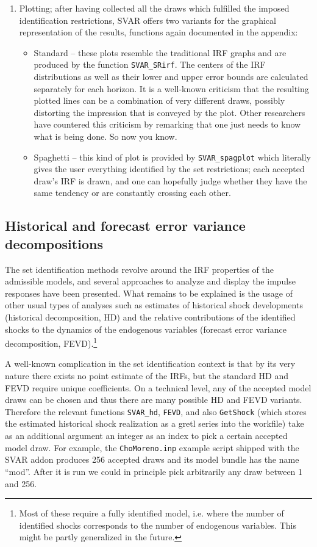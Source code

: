 \documentclass[a4paper,10pt]{article}
\newcounter{script}[section]
\begin{document}
\begin{enumerate}
\item Plotting; after having collected all the draws which fulfilled the imposed
  identification restrictions, SVAR offers two variants for the graphical
  representation of the results, functions again documented in the appendix:
  \begin{itemize}
  \item Standard -- these plots resemble the traditional IRF graphs and are produced 
    by the function \texttt{SVAR\_SRirf}. The centers of the
    IRF distributions as well as their lower and upper error bounds are calculated 
    separately for each horizon. It is a well-known criticism that the resulting plotted
    lines can be a combination of very different draws, possibly distorting the impression 
    that is conveyed by the plot. Other researchers have countered this criticism by 
    remarking that one just needs to know what is being done. So now you know.
  \item Spaghetti -- this kind of plot is provided by \texttt{SVAR\_spagplot} which 
  literally gives the user everything identified by the 
  set restrictions; each accepted draw's IRF is drawn, and one can hopefully judge 
  whether they have the same tendency or are constantly crossing each other.
 \end{itemize}

\end{enumerate}

\subsection{Historical and forecast error variance decompositions}

The set identification methods revolve around the IRF properties of the 
admissible models, and several approaches to analyze and display the 
impulse responses have been presented. What remains to be explained 
is the usage of other usual types of analyses such as estimates of historical
shock developments (historical decomposition, HD) and the relative contributions
of the identified shocks to the dynamics of the endogenous variables (forecast
error variance decomposition, FEVD).\footnote{Most of these require a fully
identified model, i.e. where the number of identified shocks corresponds to
the number of endogenous variables. This might be partly generalized in the
future.}

A well-known complication in the set identification context is that by its very 
nature there exists no point estimate of the IRFs, but the standard HD and FEVD 
require unique coefficients. On a technical level, any of the accepted model draws
can be chosen and thus there are many possible HD and FEVD variants. Therefore
the relevant functions \texttt{SVAR\_hd}, \texttt{FEVD}, and also \texttt{GetShock}
(which stores the estimated historical shock realization as a gretl series into the
workfile) take as an additional argument an integer as an index to pick a certain
accepted model draw.
For example, the \texttt{ChoMoreno.inp} example script shipped with the SVAR 
addon produces 256 accepted draws and its model bundle has the name ``mod''.
After it is run we could in principle pick arbitrarily any draw between 1 and 256.
\end{document}
